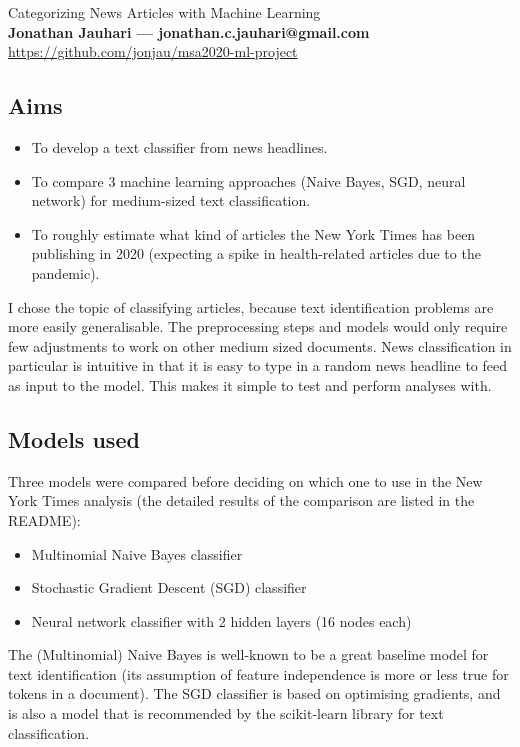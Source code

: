 \documentclass[11pt]{article}
\begin{document}
\Large{Categorizing News Articles with Machine Learning} \\[2mm]
\large\textbf{Jonathan Jauhari --- jonathan.c.jauhari@gmail.com} \\[2mm]
\url{https://github.com/jonjau/msa2020-ml-project}

\subsection*{Aims}

\begin{itemize}
    \item To develop a text classifier from news headlines.
    \item To compare 3 machine learning approaches (Naive Bayes, SGD, neural 
          network) for medium-sized text classification.
    \item To roughly estimate what kind of articles the New York Times has been
          publishing in 2020 (expecting a spike in health-related articles
          due to the pandemic).
\end{itemize}

I chose the topic of classifying articles, because text identification
problems are more easily generalisable. The preprocessing steps and models
would only require few adjustments to work on other medium sized documents.
News classification in particular is intuitive in that it is easy to type in
a random news headline to feed as input to the model. This makes it simple to
test and perform analyses with.

\subsection*{Models used}

Three models were compared before deciding on which one to use in the New
York Times analysis (the detailed results of the comparison are listed in the
README):

\begin{itemize}
    \item Multinomial Naive Bayes classifier
    \item Stochastic Gradient Descent (SGD) classifier
    \item Neural network classifier with 2 hidden layers (16 nodes each)
\end{itemize}

The (Multinomial) Naive Bayes is well-known to be a great baseline model for
text identification (its assumption of feature independence is more or less
true for tokens in a document). The SGD classifier is based on
optimising gradients, and is also a model that is recommended by the
scikit-learn library for text classification.
\end{document}
